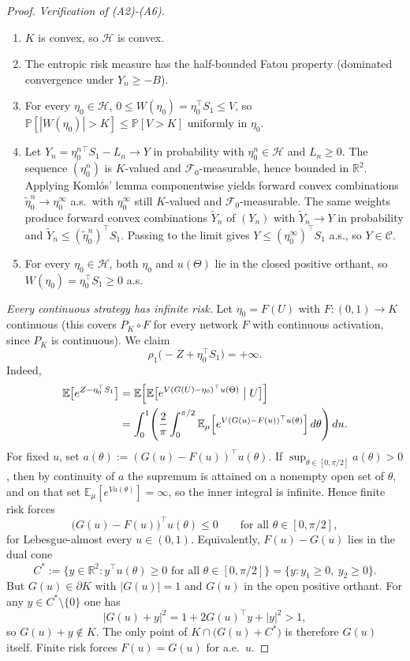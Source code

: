 \documentclass[11pt,a4paper]{report}
\numberwithin{equation}{chapter}
\theoremstyle{plain}
\theoremstyle{definition}
\newcommand{\E}{\mathbb{E}}
\newcommand{\PP}{\mathbb{P}}
\newcommand{\R}{\mathbb{R}}
\newcommand{\F}{\mathcal{F}}
\newcommand{\HH}{\mathcal{H}}
\newcommand{\CC}{\mathcal{C}}
\begin{document}
\begin{proof}
    \emph{Verification of (A2)-(A6).}
    \begin{enumerate}[leftmargin=*,itemsep=0pt,parsep=0pt]
        \item[\textup{(A2)}] $K$ is convex, so $\HH$ is convex.
        \item[\textup{(A3)}] The entropic risk measure has the half-bounded Fatou property (dominated convergence under $Y_n\ge-B$).
        \item[\textup{(A4)}] For every $\eta_0\in\HH$, $0\le W(\eta_0)=\eta_0^\top S_1\le V$, so $\PP[|W(\eta_0)|>K]\le\PP[V>K]$ uniformly in $\eta_0$.
        \item[\textup{(A5)}] Let $Y_n=\eta_0^n{}^\top S_1-L_n\to Y$ in probability with $\eta_0^n\in\HH$ and $L_n\ge0$. The sequence $(\eta_0^n)$ is $K$-valued and $\F_0$-measurable, hence bounded in $\R^2$. Applying Koml\'os' lemma componentwise yields forward convex combinations $\widetilde\eta_0^n\to\eta_0^\infty$ a.s.\ with $\eta_0^\infty$ still $K$-valued and $\F_0$-measurable. The same weights produce forward convex combinations $\widetilde Y_n$ of $(Y_n)$ with $\widetilde Y_n\to Y$ in probability and $\widetilde Y_n\le(\widetilde\eta_0^n)^\top S_1$. Passing to the limit gives $Y\le(\eta_0^\infty)^\top S_1$ a.s., so $Y\in\CC$.
        \item[\textup{(A6)}] For every $\eta_0\in\HH$, both $\eta_0$ and $u(\Theta)$ lie in the closed positive orthant, so $W(\eta_0)=\eta_0^\top S_1\ge0$ a.s.
    \end{enumerate}

    \emph{Every continuous strategy has infinite risk.} Let $\eta_0=F(U)$ with $F\colon(0,1)\to K$ continuous (this covers $P_K\circ F$ for every network $F$ with continuous activation, since $P_K$ is continuous). We claim
    \[
        \rho_1\bigl(-Z+\eta_0^\top S_1\bigr)=+\infty.
    \]
    Indeed,
    \begin{align*}
        \E\bigl[e^{Z-\eta_0^\top S_1}\bigr]
         & =\E\Bigl[\E\bigl[e^{V(G(U)-\eta_0)^\top u(\Theta)}\bigm|U\bigr]\Bigr]                                             \\
         & =\int_0^1\Biggl(\frac{2}{\pi}\int_0^{\pi/2}\E_\mu\Bigl[e^{V(G(u)-F(u))^\top u(\theta)}\Bigr]\,d\theta\Biggr)\,du.
    \end{align*}
    For fixed $u$, set $a(\theta):=(G(u)-F(u))^\top u(\theta)$. If $\sup_{\theta\in[0,\pi/2]}a(\theta)>0$, then by continuity of $a$ the supremum is attained on a nonempty open set of $\theta$, and on that set $\E_\mu[e^{Va(\theta)}]=\infty$, so the inner integral is infinite. Hence finite risk forces
    \[
        \bigl(G(u)-F(u)\bigr)^\top u(\theta)\le0\qquad\text{for all }\theta\in[0,\pi/2],
    \]
    for Lebesgue-almost every $u\in(0,1)$. Equivalently, $F(u)-G(u)$ lies in the dual cone
    \[
        C^*:=\bigl\{y\in\R^2:y^\top u(\theta)\ge0\text{ for all }\theta\in[0,\pi/2]\bigr\}=\{y:y_1\ge0,\ y_2\ge0\}.
    \]
    But $G(u)\in\partial K$ with $|G(u)|=1$ and $G(u)$ in the open positive orthant. For any $y\in C^*\setminus\{0\}$ one has
    \[
        |G(u)+y|^2=1+2G(u)^\top y+|y|^2>1,
    \]
    so $G(u)+y\notin K$. The only point of $K\cap\bigl(G(u)+C^*\bigr)$ is therefore $G(u)$ itself. Finite risk forces $F(u)=G(u)$ for a.e.\ $u$.


\end{proof}
\end{document}
